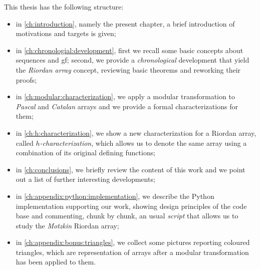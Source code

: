 
This thesis has the following structure:
\begin{itemize}
    \item in \autoref{ch:introduction}, namely the present chapter,
        a brief introduction of motivations and targets is given;
    \item in \autoref{ch:chronologial:development}, first we recall
        some basic concepts about sequences and \ac{gf}; second,
        we provide a \emph{chronological} development that yield
        the \emph{Riordan array} concept, reviewing basic theorems
        and reworking their proofs;
    \item in \autoref{ch:modular:characterization}, we apply a modular
        transformation to \emph{Pascal} and \emph{Catalan} arrays and
        we provide a formal characterizations for them;
    \item in \autoref{ch:h:characterization}, we show a new characterization
        for a Riordan array, called \emph{$h$-characterization}, which
        allows us to denote the same array using a combination of its
        original defining functions;
    \item in \autoref{ch:conclusions}, we briefly review the content of this
        work and we point out a list of further interesting developments;
    \item in \autoref{ch:appendix:python:implementation}, we describe
        the Python implementation supporting our work, showing design principles
        of the code base and commenting, chunk by chunk, an usual \emph{script}
        that allows us to study the \emph{Motzkin} Riordan array;
    \item in \autoref{ch:appendix:bonus:triangles}, we collect some pictures
        reporting coloured triangles, which are representation of arrays
        after a modular transformation has been applied to them.
\end{itemize}
